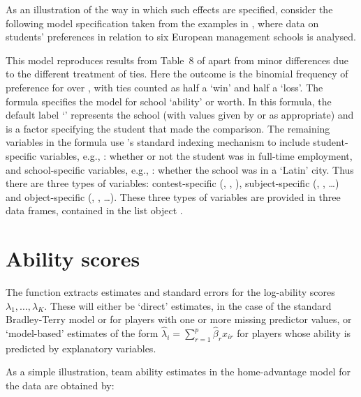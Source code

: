 As an illustration of the way in which such effects are specified, consider
the following model specification taken from the examples in ,
where data on students' preferences in relation to six European management
schools is analysed.

\vspace*{-0.3cm}

\Rcodeplaceholder{}

This model reproduces results from Table~8 of \cite{ditt:01} apart
from minor differences due to the different treatment of ties. Here the
outcome is the binomial frequency of preference for 
over , with ties counted as half a `win' and half a `loss'. The
formula specifies the model for school `ability' or worth. In this formula,
the default label `' represents the school (with values given by
 or  as appropriate) and  is a
factor specifying the student that made the comparison. The remaining
variables in the formula use 's standard indexing mechanism to include
student-specific variables, e.g., : whether or not the student was in
full-time employment, and school-specific variables, e.g., : whether
the school was in a `Latin' city. Thus there are three types of variables:
contest-specific (, , ),
subject-specific (, , \ldots) and object-specific
(, , \ldots). These three types of variables are
provided in three data frames, contained in the list object .

\section{Ability scores}
\label{sec:ability}

The function  extracts estimates and standard errors for
the log-ability scores $\lambda_1, \ldots,\lambda_K$.  These will either be
`direct' estimates, in the case of the standard Bradley-Terry model or for
players with one or more missing predictor values, or `model-based' estimates
of the form $\hat\lambda_i=\sum_{r=1}^p\hat\beta_rx_{ir}$ for players whose ability is
predicted by explanatory variables.

As a simple illustration, team ability estimates in the
home-advantage model for the  data are obtained by:

\Rcodeplaceholder{}

